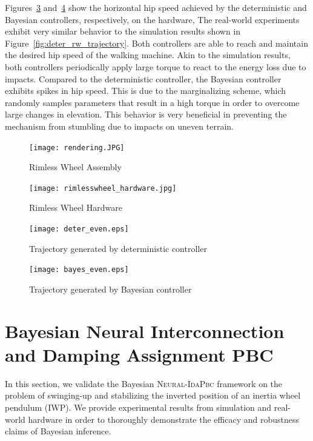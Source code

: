 Figures~\ref{fig:deter_even} and~\ref{fig:bayes_even} show the horizontal hip
speed achieved by the deterministic and Bayesian controllers, respectively, on
the hardware,
%
The real-world experiments exhibit very similar behavior to the simulation
results shown in Figure~\ref{fig:deter_rw_trajectory}.
%
Both controllers are able to reach and maintain the desired hip speed of the
walking machine.
%
Akin to the simulation results, both controllers periodically apply large torque
to react to the energy loss due to impacts.
%
Compared to the deterministic controller, the Bayesian controller exhibits spikes
in hip speed.
%
This is due to the marginalizing scheme, which randomly samples parameters
that result in a high torque in order to overcome large changes in elevation.
%
This behavior is very beneficial in preventing the mechanism from stumbling due
to impacts on uneven terrain. 

\begin{figure}[H]
    \centering
    \texttt{[image: rendering.JPG]}
    \caption{Rimless Wheel Assembly}
    \label{fig:hardware}
\end{figure}
\begin{figure}[H]
    \centering
    \texttt{[image: rimlesswheel\_hardware.jpg]}
    \caption{Rimless Wheel Hardware}
    \label{fig:rw_picture}
\end{figure}
\begin{figure}[H]
    \centering
    \texttt{[image: deter\_even.eps]}
    \caption{Trajectory generated by deterministic controller}
    \label{fig:deter_even}
\end{figure}
\begin{figure}[H]
    \centering
    \texttt{[image: bayes\_even.eps]}
    \caption{Trajectory generated by Bayesian controller}
    \label{fig:bayes_even}
\end{figure}

\section{Bayesian Neural Interconnection and Damping Assignment PBC}

In this section, we validate the Bayesian \textsc{Neural-IdaPbc} framework on the
problem of swinging-up and stabilizing the inverted position of an inertia wheel
pendulum (IWP). 
%
We provide experimental results from simulation and real-world hardware in order
to thoroughly demonstrate the efficacy and robustness claims of Bayesian
inference.
